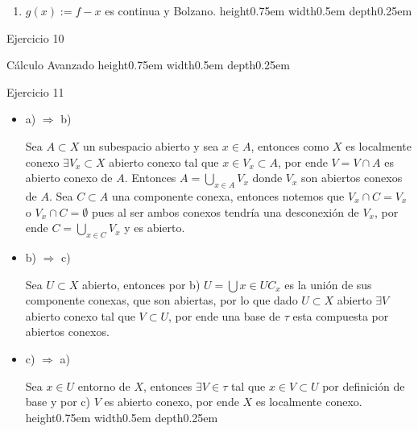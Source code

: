 \documentclass[11pt]{article}
\newenvironment{proof}[1][Demostraci\'on]{\begin{trivlist}
\item[\hskip \labelsep {\bfseries #1}]}{\end{trivlist}}
\newcommand{\qed}{\nobreak \ifvmode \relax \else
      \ifdim\lastskip<1.5em \hskip-\lastskip
      \hskip1.5em plus0em minus0.5em \fi \nobreak
      \vrule height0.75em width0.5em depth0.25em\fi}
\begin{document}
\begin{enumerate}
\begin{proof}
\begin{enumerate}
\item $g(x):=f - x$ es continua y Bolzano. \qed

\end{enumerate}

\end{proof}

\item {Ejercicio 10}

\begin{proof}

C\'alculo Avanzado \qed

\end{proof}

\item {Ejercicio 11}

\begin{proof}

\begin{itemize}

\item {a) $\Longrightarrow$ b)}

Sea $A \subset X$ un subespacio abierto y sea $x \in A$, entonces como $X$ es localmente conexo $\exists V_x \subset X$ abierto conexo tal que $x \in V_x \subset A$, por ende $V = V \cap A$ es abierto conexo de $A$. Entonces $A = \bigcup_{x \in A} {V_x}$ donde $V_x$ son abiertos conexos de $A$. Sea $C \subset A$ una componente conexa, entonces notemos que $V_x \cap C = V_x$ o $V_x \cap C = \emptyset$ pues al ser ambos conexos tendr\'ia una desconexi\'on de $V_x$, por ende $C = \bigcup_{x \in C}{V_x}$ y es abierto.

\item {b) $\Longrightarrow$ c)}

Sea $U \subset X$ abierto, entonces por b) $U = \bigcup{x \in U} {C_x}$ es la uni\'on de sus componente conexas, que son abiertas, por lo que dado $U \subset X$ abierto $\exists V$ abierto conexo tal que $V \subset U$, por ende una base de $\tau$ esta compuesta por abiertos conexos.

\item {c) $\Longrightarrow$ a)}

Sea $x \in U$ entorno de $X$, entonces $\exists V \in \tau$ tal que $x \in V \subset U$ por definici\'on de base y por c) $V$ es abierto conexo, por ende $X$ es localmente conexo. \qed

\end{itemize}

\end{proof}


\end{enumerate}
\end{document}
